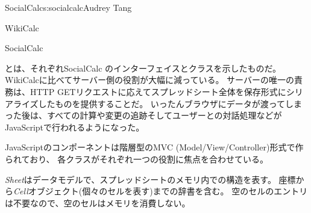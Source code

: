 \begin{aosachapter}{SocialCalc}{s:socialcalc}{Audrey Tang}
\begin{aosasect1}{WikiCalc}
\end{aosasect1}

\begin{aosasect1}{SocialCalc}


とは、それぞれSocialCalc
のインターフェイスとクラスを示したものだ。WikiCalcに比べてサーバー側の役割が大幅に減っている。
サーバーの唯一の責務は、HTTP GETリクエストに応えてスプレッドシート全体を保存形式にシリアライズしたものを提供することだ。
いったんブラウザにデータが渡ってしまった後は、すべての計算や変更の追跡そしてユーザーとの対話処理などが
JavaScriptで行われるようになった。


JavaScriptのコンポーネントは階層型のMVC (Model/View/Controller)形式で作られており、
各クラスがそれぞれ一つの役割に焦点を合わせている。

\begin{aosadescription}

  \item{\emph{Sheet}}はデータモデルで、スプレッドシートのメモリ内での構造を表す。
  座標から\emph{Cell}オブジェクト(個々のセルを表す)までの辞書を含む。
  空のセルのエントリは不要なので、空のセルはメモリを消費しない。


\end{aosadescription}
\end{aosasect1}
\end{aosachapter}
